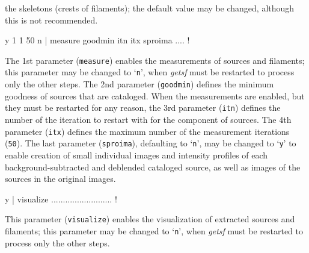 \documentclass[a4paper,10pt]{article}
\begin{document}
the skeletons (crests of filaments); the default value may be changed, although this is not recommended.
\begin{verbnobox}[\mbox{}\small]
 y 1 1 50 n          | measure goodmin itn itx sproima .... !
\end{verbnobox}
The 1st parameter (\verb!measure!) enables the measurements of sources and filaments; this parameter may be changed to `\verb!n!',
when \textsl{getsf} must be restarted to process only the other steps. The 2nd parameter (\verb!goodmin!) defines the minimum
goodness of sources that are cataloged. When the measurements are enabled, but they must be restarted for any reason, the 3rd
parameter (\verb!itn!) defines the number of the iteration to restart with for the component of sources. The 4th parameter
(\verb!itx!) defines the maximum number of the measurement iterations (\verb!50!). The last parameter (\verb!sproima!), defaulting
to `\verb!n!', may be changed to `\verb!y!' to enable creation of small individual images and intensity profiles of each
background-subtracted and deblended cataloged source, as well as images of the sources in the original images.
\begin{verbnobox}[\mbox{}\small]
 y                   | visualize .......................... !
\end{verbnobox}
This parameter (\verb!visualize!) enables the visualization of extracted sources and filaments; this parameter may be changed to
`\verb!n!', when \textsl{getsf} must be restarted to process only the other steps. 
\end{document}
